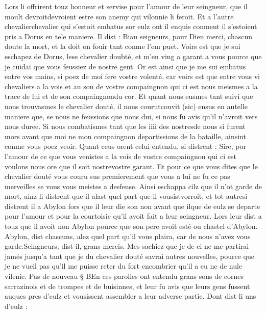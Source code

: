 \documentclass{article}
\begin{document}
\begin{pages}
   Lors li offrirent touz honneur et servise pour l’amour de leur seingneur, 
   que il moult devroitdevroient 
   estre son anemy qui vilonnie li feroit. Et a 
   l’autre chevalierchevalier 
   qui s'estoit embatus sor eulz 
   ont il enquis conment il s’estoient pris a Dorus en tele maniere. Il dist :
   Biau seigneurs, pour Dieu merci, chascun doute la mort, et la doit on fouir tant conme l’em puet. 
      Voirs est que je sui eschapez de Dorus, lese 
      chevalier doubté, et m’en ving a garant a vous pource que je cuidai que vous feussiez de nostre gent. Or est ainsi que je me sui 
      embatus entre vos mains, si poez de moi fere vostre volenté, car voirs est que entre vous vi chevaliers a la vois 
      et au son de vostre compaingnon qui ci est nous meismes a la trace 
         de lui et de son compaingnondu cor. Et quant nous eusmes tant suivi que nous trouvasmes 
      le chevalier douté, il nous 
      courutcouvit (sic) 
      ensus en 
      autelle maniere que, se nous ne feussions que nous dui, si nous fu avis qu’il n’avroit vers nous duree. Si nous combatismes tant 
      que les iiii des nostresde nous si furent mors avant que moi 
      ne mon compaingnon departissions de la bataille, ainsint conme vous poez veoir. \pend
\pstart Quant ceus orent celui entendu, si distrent :
   Sire, por l’amour de ce que vous venistes a la vois de 
      vostre compaingnon qui ci est voulons nous ore que il soit 
      nostrevostre garant. Et pour ce que vous dites que 
      le chevalier douté 
   vous couru sus premierement que vous a lui ne fu ce pas merveilles se vous vous meistes a desfense.
   Ainsi eschappa cilz que il n’ot garde de mort, ainz li distrent que il alast quel part que il 
      vousistvorroit, et tot autresi distrent il a 
   Abylon fors que il leur die son non avant 
   que ilque 
   de eulz se departe pour l’amour et pour la courtoisie qu’il avoit fait a leur seingneur. 
   Lors leur dist a touz que il avoit non 
      Abylon pource que son pere avoit esté ou chastel d’Abylon.
   Abylon, dist chascuns, alez quel part qu’il vous plaira, 
   car de nous n’avez vous garde.Seingneurs, dist il, grans mercis. Mes sachiez que je de ci ne me partirai 
      jamés jusqu’a tant que je du chevalier douté 
      savrai autres nouvelles, pource que je ne vueil pas qu’il me puisse reter 
      du fort encombrier qu’il a eu ne 
      de nule vilenie. \pend
\pstart Pas de nouveau § BEn ces parolles ont entendu grans sons de 
   cornes sarrazinois et de trompes et de buisinnes, 
   et leur fu avis que leurs gens fussent auques pres d’eulz et vousissent assembler a leur adverse partie. Dont dist li uns d’eulz :

\end{pages}
\end{document}
